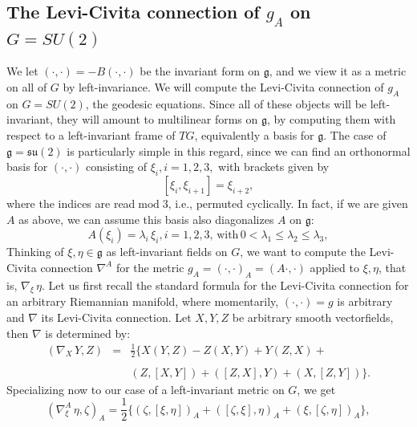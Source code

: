 \documentclass[12pt,reqno]{amsart}\usepackage{amssymb,amsmath,amscd,epsfig,amsthm,enumerate,import,eufrak}
\theoremstyle{definition}
\theoremstyle{remark}
\numberwithin{equation}{section}
\theoremstyle{plain}
\theoremstyle{definition}
\def \mfg {\mathfrak{g}}
\def \mod {\; \text{mod}\;}
\def \naba {\nabla^A}
\theoremstyle{remark}
\numberwithin{theorem}{section}
\begin{document}
\subsection{The Levi-Civita connection of $g_A$ on $G = SU(2)$} \label{sub:LCA} We let $(\cdot,\cdot) = -B(\cdot,\cdot)$ be the invariant form on $\mfg$, and we view it as a metric on all of $G$ by left-invariance. We will compute the Levi-Civita connection of $g_A$ on $G = SU(2)$, the geodesic equations. Since all of these objects will be left-invariant, they will amount to multilinear forms on $\mfg$, by computing them with respect to a left-invariant frame of $TG$, equivalently a basis for $\mfg$. The case of $\mfg = \mathfrak{su}(2)$ is particularly simple in this regard, since we can find an orthonormal basis for $(\cdot,\cdot)$ consisting of $\xi_i, i = 1,2,3,$ with brackets given by
%
%
\begin{equation} \label{eqn:structureconstants}
	[\xi_i, \xi_{i+1}] = \xi_{i+2},
\end{equation}
%
%
where the indices are read$\mod 3$, i.e., permuted cyclically. In fact, if we are given $A$ as above, we can assume this basis also diagonalizes $A$ on $\mfg$:
%
%
\begin{equation} \label{eqn:eigenbasis}
	A(\xi_i) = \lambda_i \, \xi_i, i = 1,2,3, \,\text{with} \, 0 < \lambda_1 \leq \lambda_2 \leq \lambda_3,
\end{equation}
%
%
Thinking of $\xi, \eta \in \mfg$ as left-invariant fields on $G$, we want to compute the Levi-Civita connection $\naba$ for the metric $g_A = (\cdot,\cdot)_A = (A\cdot,\cdot)$ applied to $\xi, \eta$, that is, $\nabla_{\xi}\, \eta.$ Let us first recall the standard formula for the Levi-Civita connection for an arbitrary Riemannian manifold, where momentarily, $(\cdot,\cdot)=g$ is arbitrary and $\nabla$ its Levi-Civita connection. Let $X, Y, Z$ be arbitrary smooth vectorfields, then $\nabla$ is determined by:
%
%
%
\begin{equation} \label{eqn:LC}
	\begin{array}{rcl}
		(\nabla_X\, Y, Z) & = & \frac12 \{X(Y, Z) - Z(X, Y) + Y(Z, X) +\\
					&	&	\\
					&	&  (Z, [X, Y]) + ([Z, X], Y) + (X, [Z, Y]) \}. 
	\end{array}
\end{equation}
%
%
Specializing now to our case of a left-invariant metric on $G$, we get
%
%
\begin{equation} \label{eqn:LCG}
	(\naba_{\xi}\, \eta, \zeta)_A = \frac12\{ (\zeta, [\xi, \eta])_A + ([\zeta, \xi], \eta)_A  + (\xi, [\zeta, \eta])_A\},
\end{equation}
\end{document}
